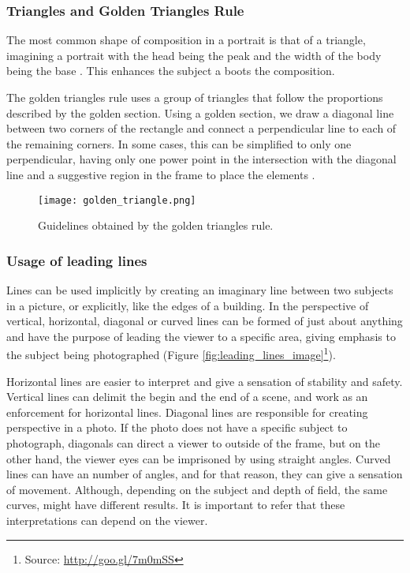 \subsubsection{Triangles and Golden Triangles Rule}
\label{subsub:rule_triangles}

The most common shape of composition in a portrait is that of a triangle, imagining a portrait with the head being the peak and the width of the body being the base \cite{cleghorn2004portrait}. This enhances the subject a boots the composition.

The golden triangles rule uses a group of triangles that follow the proportions described by the golden section. Using a golden section, we draw a diagonal line between two corners of the rectangle and connect a perpendicular line to each of the remaining corners. In some cases, this can be simplified to only one perpendicular, having only one power point in the intersection with the diagonal line and a suggestive region in the frame to place the elements \cite{Santos}.

\begin{figure}[htbp]
    \centering
	\label{fig:golden_triangle_example}
    \texttt{[image: golden\_triangle.png]}
	\caption{Guidelines obtained by the golden triangles rule.}
	\label{fig:golden_triangle_image}
\end{figure}

\subsubsection{Usage of leading lines}
\label{subsub:leading_lines}

Lines can be used implicitly by creating an imaginary line between two subjects in a picture, or explicitly, like the edges of a building. In the perspective of \citeauthor{kamps2012rules} \cite{kamps2012rules} vertical, horizontal, diagonal or curved lines can be formed of just about anything and have the purpose of leading the viewer to a specific area, giving emphasis to the subject being photographed (Figure \ref{fig:leading_lines_image}\footnote{Source: \url{http://goo.gl/7m0mSS}}).

Horizontal lines are easier to interpret and give a sensation of stability and safety. Vertical lines can delimit the begin and the end of a scene, and work as an enforcement for horizontal lines.
Diagonal lines are responsible for creating perspective in a photo. If the photo does not have a specific subject to photograph, diagonals can direct a viewer to outside of the frame, but on the other hand, the viewer eyes can be imprisoned by using straight angles. 
Curved lines can have an number of angles, and for that reason, they can give a sensation of movement. Although, depending on the subject and depth of field, the same curves, might have different results. It is important to refer that these interpretations can depend on the viewer.

